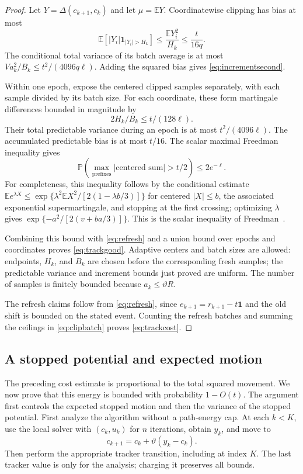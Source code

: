 \documentclass[11pt,a4paper]{article}
\newcommand{\E}{\mathbb E}
\newcommand{\Pp}{\mathbb P}
\newcommand{\ind}{\mathbf 1}
\theoremstyle{remark}
\numberwithin{equation}{section}
\begin{document}
\begin{proof}
Let $Y=\Delta(c_{k+1},c_k)$ and let $\mu=\E Y$. Coordinatewise clipping has bias at most
\[
 \E[|Y_i|\ind_{|Y_i|>H_k}]\le\frac{\E Y_i^2}{H_k}\le\frac{t}{16q}.
\]
The conditional total variance of its batch average is at most $Va_k^2/B_k\le t^2/(4096q\ell)$. Adding the squared bias gives \eqref{eq:incrementsecond}.

Within one epoch, expose the centered clipped samples separately, with each sample divided by its batch size. For each coordinate, these form martingale differences bounded in magnitude by
\[
 2H_k/B_k\le t/(128\ell).
\]
Their total predictable variance during an epoch is at most $t^2/(4096\ell)$. The accumulated predictable bias is at most $t/16$. The scalar maximal Freedman inequality gives
\[
 \Pp\left(\max_{\text{prefixes}}|\text{centered sum}|>t/2\right)\le2e^{-\ell}.
\]
For completeness, this inequality follows by the conditional estimate
$\E e^{\lambda X}\le\exp\{\lambda^2\E X^2/[2(1-\lambda b/3)]\}$ for centered $|X|\le b$, the associated exponential supermartingale, and stopping at the first crossing; optimizing $\lambda$ gives $\exp\{-a^2/[2(v+ba/3)]\}$. This is the scalar inequality of Freedman~\cite{freedman}.

Combining this bound with \eqref{eq:refresh} and a union bound over epochs and coordinates proves \eqref{eq:trackgood}. Adaptive centers and batch sizes are allowed: endpoints, $H_k$, and $B_k$ are chosen before the corresponding fresh samples; the predictable variance and increment bounds just proved are uniform. The number of samples is finitely bounded because $a_k\le\vartheta R$.

The refresh claims follow from \eqref{eq:refresh}, since $e_{k+1}=r_{k+1}-t\mathbf1$ and the old shift is bounded on the stated event. Counting the refresh batches and summing the ceilings in \eqref{eq:clipbatch} proves \eqref{eq:trackcost}.
\end{proof}

\subsection{A stopped potential and expected motion}\label{sec:stopped}
The preceding cost estimate is proportional to the total squared movement. We now prove that this energy is bounded with probability $1-O(t)$. The argument first controls the expected stopped motion and then the variance of the stopped potential.
First analyze the algorithm without a path-energy cap. At each $k<K$, use the local solver with $(c_k,u_k)$ for $n$ iterations, obtain $y_k$, and move to
\[
 c_{k+1}=c_k+\vartheta(y_k-c_k).
\]
Then perform the appropriate tracker transition, including at index $K$. The last tracker value is only for the analysis; charging it preserves all bounds.
\end{document}
